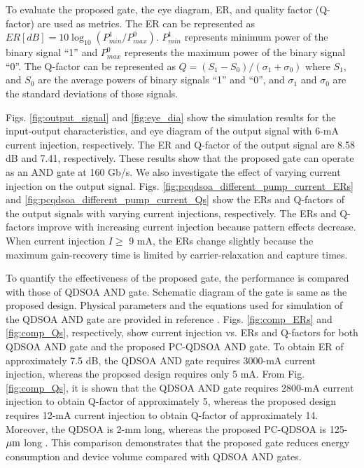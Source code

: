 \documentclass[twocolumn]{el-author}
\begin{document}
\newpage
To evaluate the proposed gate, the eye diagram, ER, and quality factor (Q-factor) are used as metrics. The ER can be represented as $ER[dB] = 10\log_{10} \left(P^{1}_{min} / P^{0}_{max} \right)$. $P^{1}_{min}$ represents minimum power of the binary signal ``1'' and $P^{0}_{max}$ represents the maximum power of the binary signal ``0''. The Q-factor can be represented as $Q = (S_{1}-S_{0})/(\sigma_{1}+\sigma_{0}) $ where $S_{1}$, and $S_{0}$ are the average powers of binary signals ``1'' and ``0'', and $\sigma_{1}$ and $\sigma_{0}$ are the standard deviations of those signals. \par
Figs. {\ref{fig:output_signal}} and {\ref{fig:eye_dia}} show the simulation results for the input-output characteristics, and eye diagram of the output signal with 6-mA current injection, respectively. The ER and Q-factor of the output signal are 8.58 dB and 7.41, respectively. These results show that the proposed gate can operate as an AND gate at 160 Gb/s. We also investigate the effect of varying current injection on the output signal. Figs. {\ref{fig:pcqdsoa_different_pump_current_ERs}} and {\ref{fig:pcqdsoa_different_pump_current_Qs}} show the ERs and Q-factors of the output signals with varying current injections, respectively. The ERs and Q-factors improve with increasing current injection because pattern effects decrease. When current injection $I \geq$ 9 mA, the ERs change slightly because the maximum gain-recovery time is limited by carrier-relaxation and capture times. \par
To quantify the effectiveness of the proposed gate, the performance is compared with those of QDSOA AND gate. Schematic diagram of the gate is same as the proposed design. Physical parameters and the equations used for simulation of the QDSOA AND gate are provided in reference {\cite{qdsoa_nssm}}. Figs. {\ref{fig:comp_ERs}} and {\ref{fig:comp_Qs}}, respectively, show current injection vs. ERs and Q-factors for both QDSOA AND gate and the proposed PC-QDSOA AND gate. To obtain ER of approximately 7.5 dB, the QDSOA AND gate requires 3000-mA current injection, whereas the proposed design requires only 5 mA. From Fig. {\ref{fig:comp_Qs}}, it is shown that the QDSOA AND gate requires 2800-mA current injection to obtain Q-factor of approximately 5, whereas the proposed design requires 12-mA current injection to obtain Q-factor of approximately 14. Moreover, the QDSOA is 2-mm long, whereas the proposed PC-QDSOA is 125-${\rm{\mu m}}$ long {\cite{qdsoa_nssm,pcqdsoa}}. This comparison demonstrates that the proposed gate reduces energy consumption and device volume compared with QDSOA AND gates.
\end{document}
